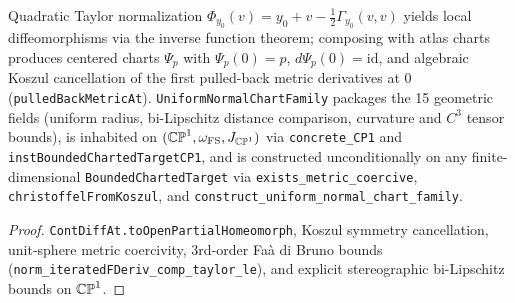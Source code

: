 \begin{theorem}
\label{n2_normal}
\leanok
{}
Quadratic Taylor normalization $\Phi_{y_0}(v)=y_0+v-\tfrac12\Gamma_{y_0}(v,v)$ yields local
diffeomorphisms via the inverse function theorem; composing with atlas charts produces centered
charts $\Psi_p$ with $\Psi_p(0)=p$, $d\Psi_p(0)=\mathrm{id}$, and algebraic Koszul cancellation of
the first pulled-back metric derivatives at $0$ (\texttt{pulledBackMetricAt}). \texttt{UniformNormalChartFamily}
packages the 15 geometric fields (uniform radius, bi-Lipschitz distance comparison, curvature and $C^3$
tensor bounds), is inhabited on $(\mathbb{CP}^1,\omega_{\mathrm{FS}},J_{\mathbb{CP}^1})$ via \texttt{concrete\_CP1} and
\texttt{instBoundedChartedTargetCP1}, and is constructed unconditionally on any finite-dimensional
\texttt{BoundedChartedTarget} via \texttt{exists\_metric\_coercive}, \texttt{christoffelFromKoszul},
and \texttt{construct\_uniform\_normal\_chart\_family}.
\end{theorem}
\begin{proof}\leanok \texttt{ContDiffAt.toOpenPartialHomeomorph}, Koszul symmetry cancellation,
unit-sphere metric coercivity, 3rd-order Fa\`a di Bruno bounds (\texttt{norm\_iteratedFDeriv\_comp\_taylor\_le}),
and explicit stereographic bi-Lipschitz bounds on $\mathbb{CP}^1$.\end{proof}

